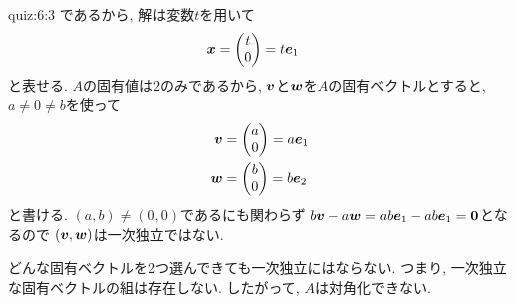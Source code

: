 \begin{answerof}{quiz:6:3}
  であるから, 解は変数$t$を用いて
  \begin{align*}
    \boldsymbol{x}&=\begin{pmatrix}t\\0\end{pmatrix} =t\boldsymbol{e}_1
  \end{align*}
  と表せる.
  $A$の固有値は$2$のみであるから,
  $\boldsymbol{v}$と$\boldsymbol{w}$を$A$の固有ベクトルとすると,
  $a\neq 0\neq b$を使って
  \begin{align*}
    \boldsymbol{v}&=\begin{pmatrix}a\\0\end{pmatrix}=a\boldsymbol{e}_1 \\
    \boldsymbol{w}&=\begin{pmatrix}b\\0\end{pmatrix}=b\boldsymbol{e}_2
  \end{align*}
  と書ける. $(a,b)\neq(0,0)$であるにも関わらず
  $b \boldsymbol{v}-a\boldsymbol{w} = ab\boldsymbol{e}_1-ab\boldsymbol{e}_1=\boldsymbol{0}$となるので
  $(\boldsymbol{v},\boldsymbol{w})$は一次独立ではない.

  どんな固有ベクトルを2つ選んできても一次独立にはならない.
  つまり, 一次独立な固有ベクトルの組は存在しない.
  したがって, $A$は対角化できない.
\end{answerof}


